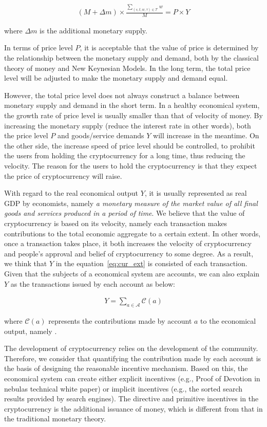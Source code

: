 \begin{align}
(M + \Delta{m}) \times \frac{\sum_{(s, t, w, \tau)\in \mathcal{T}}{w}}{M} = P \times Y
\label{eq:cur_ext}
\end{align}

\noindent where $\Delta{m}$ is the additional monetary supply. 

In terms of price level $P$, it is acceptable that the value of price is determined by the relationship between the monetary supply and demand, both by the classical theory of money and New Keynesian Models. In the long term, the total price level will be adjusted to make the monetary supply and demand equal.

However, the total price level does not always construct a balance between monetary supply and demand in the short term. In a healthy economical system, the growth rate of price level is usually smaller than that of velocity of money. By increasing the monetary supply (reduce the interest rate in other words), both the price level $P$ and goods/service demands $Y$ will increase in the meantime. On the other side, the increase speed of price level should be controlled, to prohibit the users from holding the cryptocurrency for a long time, thus reducing the velocity. The reason for the users to hold the cryptocurrency is that they expect the price of cryptocurrency will raise.


With regard to the real economical output $Y$, it is usually represented as real GDP by economists, namely \emph{a monetary measure of the market value of all final goods and services produced in a period of time}. We believe that the value of cryptocurrency is based on its velocity, namely each transaction makes contributions to the total economic aggregate to a certain extent. In other words, once a transaction takes place, it both increases the velocity of cryptocurrency and people's approval and belief of cryptocurrency to some degree. As a result, we think that $Y$ in the equation~\ref{eq:cur_ext} is consisted of each transaction. Given that the subjects of a economical system are accounts, we can also explain $Y$ as the transactions issued by each account as below:

\begin{align}
Y=\sum_{a\in \mathcal{A}} \mathcal{C}(a)
\end{align}

\noindent where $\mathcal{C}(a)$ represents the contributions made by account $a$ to the economical output, namely \nrcore.

The development of cryptocurrency relies on the development of the community. Therefore, we consider that quantifying the contribution made by each account is the basis of designing the reasonable incentive mechanism. Based on this, the economical system can create either explicit incentives (e.g., Proof of Devotion in nebulas technical white paper) or implicit incentives (e.g., the sorted search results provided by search engines). 
The directive and primitive incentives in the cryptocurrency is the additional issuance of money, which is different from that in the traditional monetary theory.